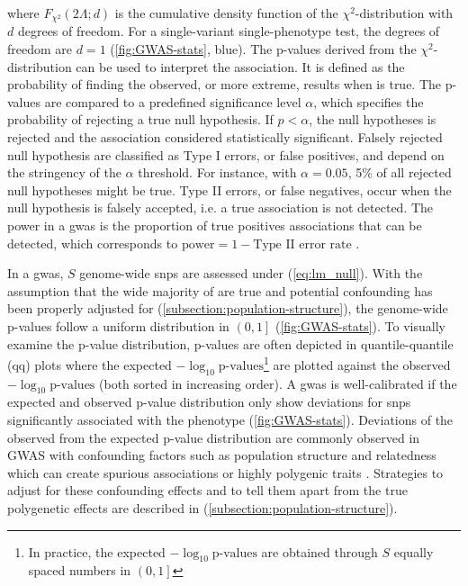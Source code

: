 where \(F_{\chi^2}\left(2\Lambda; d\right)\) is the cumulative density function of the \(\chi^2\)-distribution with \(d\) degrees of freedom. For a single-variant single-phenotype test, the degrees of freedom are \(d=1\) (\cref{fig:GWAS-stats}, blue). The p-values derived from the \(\chi^2\)-distribution can be used to interpret the association. It is defined as the probability of finding the observed, or more extreme, results when \tnullH is true. The p-values are compared to a predefined significance level \(\alpha\), which specifies the probability of rejecting a true null hypothesis. If \(p < \alpha\), the null hypotheses is rejected and the association considered statistically significant. Falsely rejected null hypothesis are classified as Type I errors, or false positives, and depend on the stringency of the \(\alpha\) threshold. For instance, with  \(\alpha=0.05\), 5\% of all rejected null hypotheses might be true. Type II errors, or false negatives, occur when the null hypothesis is falsely accepted, i.e. a true association is not detected. The power in a \gls{gwas} is the proportion of true positives associations that can be detected, which corresponds to \(\text{power} = 1 - \text{Type II error rate}\)  \citep{Krzywinski2013a,Krzywinski2013b}.

In a \gls{gwas}, \(S\) genome-wide \glspl{snp} are assessed under \tnullH (\cref{eq:lm_null}). With the assumption that the wide majority of \tnullH are true and potential confounding has been properly adjusted for (\cref{subsection:population-structure}), the genome-wide p-values follow a uniform distribution in \(\left(0,1\right]\) (\cref{fig:GWAS-stats}). To visually examine the p-value distribution, p-values are often depicted in quantile-quantile (qq) plots where the expected \(-\log_{10} \text{p-values}\)\footnote{In practice, the expected \(-\log_{10} \text{p-values}\) are obtained through \(S\) equally spaced numbers in \(\left(0,1\right]\)} are plotted against the observed \(-\log_{10} \text{p-values}\) (both sorted in increasing order). A \gls{gwas} is well-calibrated if the expected and observed p-value distribution only show deviations for \glspl{snp} significantly associated with the phenotype (\cref{fig:GWAS-stats}). Deviations of the observed from the expected p-value distribution are commonly observed in GWAS with confounding factors such as population structure and relatedness which can create spurious associations or highly polygenic traits \citep{Spielman1993,Lander1994,Marchini2004,Balding2006}. Strategies to adjust for these confounding effects and to tell them apart from the true polygenetic effects are described in (\cref{subsection:population-structure}). 

